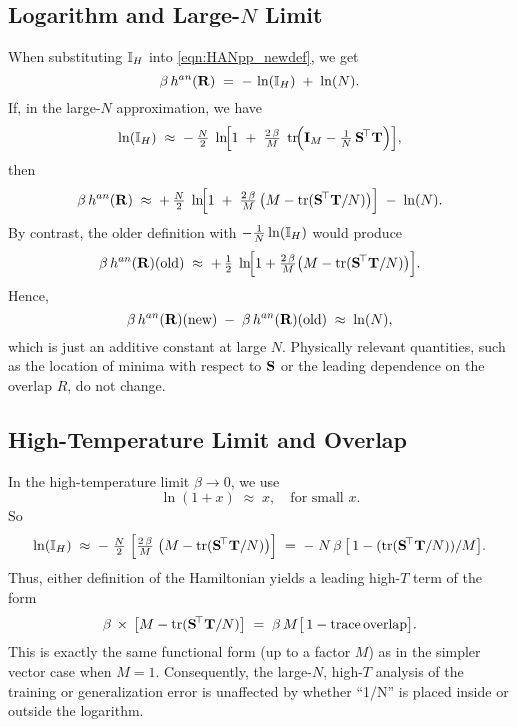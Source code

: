 \documentclass[11pt]{article}
\begin{document}
\subsection{Logarithm and Large-\(N\) Limit}
When substituting \(\mathbb{I}_{H}\) into \eqref{eqn:HANpp_newdef}, we get
\begin{equation}
\beta\,h^{an}(\mathbf{R})
\;=\;
-\,\ln(\mathbb{I}_{H}) \;+\;\ln(N).
\end{equation}
If, in the large-\(N\) approximation, we have
\begin{equation}
\ln(\mathbb{I}_{H})
\;\approx\;
-\,\tfrac{N}{2}\;
\ln\!\Bigl[
1 \;+\;\tfrac{2\,\beta}{M}\;
\operatorname{tr}\!\Bigl(\mathbf{I}_{M}-\tfrac{1}{N}\,{\mathbf{S}}^{\!\top}{\mathbf{T}}\Bigr)
\Bigr],
\end{equation}
then
\begin{equation}
\beta\,h^{an}(\mathbf{R})
\;\approx\;
+\,\tfrac{N}{2}\;
\ln\!\Bigl[
1 \;+\;\tfrac{2\,\beta}{M}\,\bigl(M - \operatorname{tr}({\mathbf{S}}^{\!\top}{\mathbf{T}}/N)\bigr)
\Bigr]
\;-\;\ln(N).
\end{equation}
By contrast, the older definition with \(-\tfrac{1}{N}\ln(\mathbb{I}_{H})\) would produce
\begin{equation}
\beta\,h^{an}(\mathbf{R})(\text{old})
\;\approx\;
+\,\tfrac{1}{2}\;
\ln\!\Bigl[
1 + \tfrac{2\,\beta}{M}
\bigl(M - \operatorname{tr}({\mathbf{S}}^{\!\top}{\mathbf{T}}/N)\bigr)
\Bigr].
\end{equation}
Hence,
\begin{equation}
\beta\,h^{an}(\mathbf{R})(\text{new})
\;-\;
\beta\,h^{an}(\mathbf{R})(\text{old})
\;\approx\;
\ln(N),
\end{equation}
which is just an additive constant at large \(N\). Physically relevant quantities, such as the location of minima with respect to \({\mathbf{S}}\) or the leading dependence on the overlap \(R\), do not change.

\subsection{High-Temperature Limit and Overlap}
In the high-temperature limit \(\beta \to 0\), we use
\begin{equation}
\ln(1 + x)
\;\approx\;
x,
\quad
\text{for small } x.
\end{equation}
So
\begin{equation}
\ln(\mathbb{I}_{H})
\;\approx\;
-\;\tfrac{N}{2}\;\Bigl[
\tfrac{2\,\beta}{M}\;
\bigl(M - \operatorname{tr}({\mathbf{S}}^{\!\top}{\mathbf{T}}/N)\bigr)
\Bigr]
\;=\;
-\;N\,\beta\,
\bigl[\,1 - (\operatorname{tr}({\mathbf{S}}^{\!\top}{\mathbf{T}}/N))/M \bigr].
\end{equation}
Thus, either definition of the Hamiltonian yields a leading high-\(T\) term of the form
\begin{equation}
\beta \,\times\,\bigl[M - \operatorname{tr}({\mathbf{S}}^{\!\top}{\mathbf{T}}/N)\bigr]
\;=\;
\beta\,M
\bigl[\,
1 - \operatorname{trace\,overlap}
\bigr].
\end{equation}
This is exactly the same functional form (up to a factor \(M\)) as in the simpler vector case when \(M=1\). Consequently, the large-\(N\), high-\(T\) analysis of the training or generalization error is unaffected by whether “1/N” is placed inside or outside the logarithm.
\end{document}
